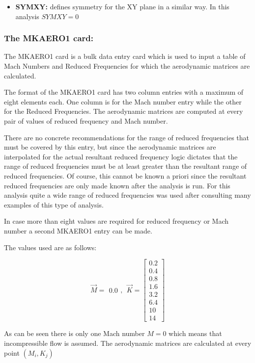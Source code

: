 \begin{itemize}
\item
  \textbf{SYMXY:} defines symmetry for the XY plane in a similar way. In
  this analysis \(SYMXY = 0\)
\end{itemize}

\subsubsection{The MKAERO1 card:}

The MKAERO1 card is a bulk data entry card which is used to input a
table of Mach Numbers and Reduced Frequencies for which the aerodynamic
matrices are calculated.

The format of the MKAERO1 card has two column entries with a maximum of
eight elements each. One column is for the Mach number entry while the
other for the Reduced Frequencies. The aerodynamic matrices are computed
at every pair of values of reduced frequency and Mach number.

There are no concrete recommendations for the range of reduced
frequencies that must be covered by this entry, but since the
aerodynamic matrices are interpolated for the actual resultant reduced
frequency logic dictates that the range of reduced frequencies must be
at least greater than the resultant range of reduced frequencies. Of
course, this cannot be known a priori since the resultant reduced
frequencies are only made known after the analysis is run. For this
analysis quite a wide range of reduced frequencies was used after
consulting many examples of this type of analysis.

In case more than eight values are required for reduced frequency or
Mach number a second MKAERO1 entry can be made.

The values used are as follows:

\[\overrightarrow{M} = \begin{matrix}
0.0
\end{matrix},\ \ \overrightarrow{K} = \begin{bmatrix}
0.2 \\
0.4 \\
0.8 \\
1.6 \\
3.2 \\
6.4 \\
10 \\
14
\end{bmatrix}\]

As can be seen there is only one Mach number \(M = 0\) which means that
incompressible flow is assumed. The aerodynamic matrices are calculated
at every point \(\left( M_{i}, K_{j} \right)\)

